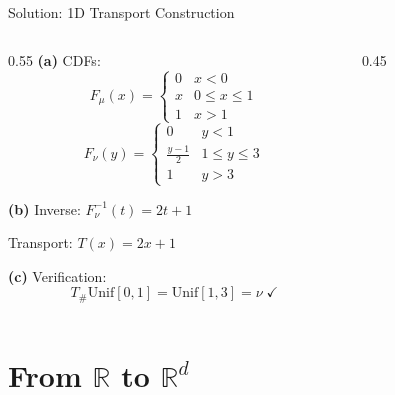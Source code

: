 \documentclass[aspectratio=169]{beamer}
\newcommand{\R}{\mathbb{R}}
\begin{document}
\begin{frame}{Solution: 1D Transport Construction}
\begin{columns}
\begin{column}{0.55\textwidth}
\textbf{(a)} CDFs:
\[
F_\mu(x) = \begin{cases} 0 & x < 0 \\ x & 0 \leq x \leq 1 \\ 1 & x > 1 \end{cases}
\]
\[
F_\nu(y) = \begin{cases} 0 & y < 1 \\ \frac{y-1}{2} & 1 \leq y \leq 3 \\ 1 & y > 3 \end{cases}
\]

\textbf{(b)} Inverse: $F_\nu^{-1}(t) = 2t + 1$

Transport: $\boxed{T(x) = 2x + 1}$

\textbf{(c)} Verification:
\[
T_\# \text{Unif}[0,1] = \text{Unif}[1, 3] = \nu \; \checkmark
\]
\end{column}
\begin{column}{0.45\textwidth}
\begin{center}
\end{center}
\end{column}
\end{columns}
\end{frame}

\section{From $\R$ to $\R^d$}
\end{document}
